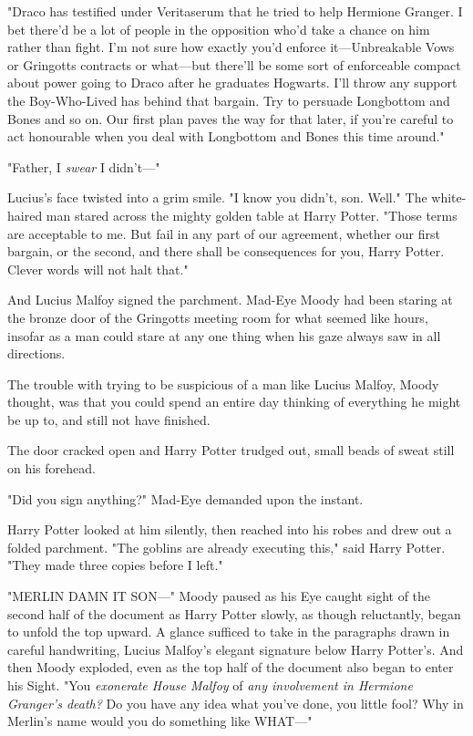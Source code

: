 "Draco has testified under Veritaserum that he tried to help Hermione Granger.
I bet there'd be a lot of people in the opposition who'd take a chance on him
rather than fight. I'm not sure how exactly you'd enforce it---Unbreakable Vows
or Gringotts contracts or what---but there'll be some sort of enforceable
compact about power going to Draco after he graduates Hogwarts. I'll throw any
support the Boy-Who-Lived has behind that bargain. Try to persuade Longbottom
and Bones and so on. Our first plan paves the way for that later, if you're
careful to act honourable when you deal with Longbottom and Bones this time
around."

"Father, I \emph{swear} I didn't---"

Lucius's face twisted into a grim smile. "I know you didn't, son. Well." The
white-haired man stared across the mighty golden table at Harry Potter. "Those
terms are acceptable to me. But fail in any part of our agreement, whether our
first bargain, or the second, and there shall be consequences for you, Harry
Potter. Clever words will not halt that."

And Lucius Malfoy signed the parchment.
\later
Mad-Eye Moody had been staring at the bronze door of the Gringotts meeting room
for what seemed like hours, insofar as a man could stare at any one thing when
his gaze always saw in all directions.

The trouble with trying to be suspicious of a man like Lucius Malfoy, Moody
thought, was that you could spend an entire day thinking of everything he might
be up to, and still not have finished.

The door cracked open and Harry Potter trudged out, small beads of sweat still
on his forehead.

"Did you sign anything?" Mad-Eye demanded upon the instant.

Harry Potter looked at him silently, then reached into his robes and drew out a
folded parchment. "The goblins are already executing this," said Harry Potter.
"They made three copies before I left."

"MERLIN DAMN IT SON---" Moody paused as his Eye caught sight of the second half
of the document as Harry Potter slowly, as though reluctantly, began to unfold
the top upward. A glance sufficed to take in the paragraphs drawn in careful
handwriting, Lucius Malfoy's elegant signature below Harry Potter's. And then
Moody exploded, even as the top half of the document also began to enter his
Sight. "You \emph{exonerate House Malfoy} of \emph{any involvement in Hermione
Granger's death?} Do you have any idea what you've done, you little fool? Why
in Merlin's name would you do something like WHAT---"
